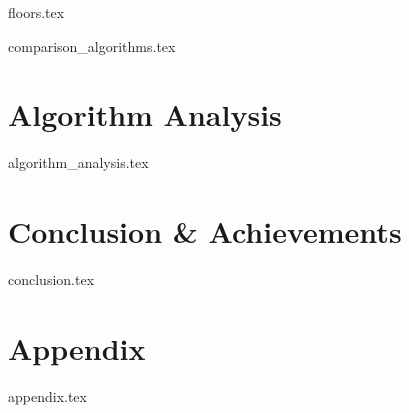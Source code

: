 \documentclass[a4paper, 11pt]{article}
\begin{document}
{floors.tex}

{comparison_algorithms.tex}

\section{Algorithm Analysis}

{algorithm_analysis.tex}

\section{Conclusion \& Achievements}

{conclusion.tex}

\clearpage

\section{Appendix}

{appendix.tex}

\printbibliography
\end{document}
